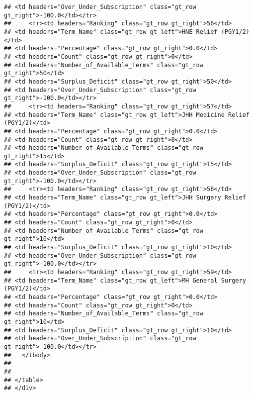 \documentclass[
]{article}
\begin{document}
\begin{verbatim}
## <td headers="Over_Under_Subscription" class="gt_row gt_right">-100.0</td></tr>
##     <tr><td headers="Ranking" class="gt_row gt_right">56</td>
## <td headers="Term_Name" class="gt_row gt_left">HNE Relief (PGY1/2)</td>
## <td headers="Percentage" class="gt_row gt_right">0.0</td>
## <td headers="Count" class="gt_row gt_right">0</td>
## <td headers="Number_of_Available_Terms" class="gt_row gt_right">50</td>
## <td headers="Surplus_Deficit" class="gt_row gt_right">50</td>
## <td headers="Over_Under_Subscription" class="gt_row gt_right">-100.0</td></tr>
##     <tr><td headers="Ranking" class="gt_row gt_right">57</td>
## <td headers="Term_Name" class="gt_row gt_left">JHH Medicine Relief (PGY1/2)</td>
## <td headers="Percentage" class="gt_row gt_right">0.0</td>
## <td headers="Count" class="gt_row gt_right">0</td>
## <td headers="Number_of_Available_Terms" class="gt_row gt_right">15</td>
## <td headers="Surplus_Deficit" class="gt_row gt_right">15</td>
## <td headers="Over_Under_Subscription" class="gt_row gt_right">-100.0</td></tr>
##     <tr><td headers="Ranking" class="gt_row gt_right">58</td>
## <td headers="Term_Name" class="gt_row gt_left">JHH Surgery Relief (PGY1/2)</td>
## <td headers="Percentage" class="gt_row gt_right">0.0</td>
## <td headers="Count" class="gt_row gt_right">0</td>
## <td headers="Number_of_Available_Terms" class="gt_row gt_right">10</td>
## <td headers="Surplus_Deficit" class="gt_row gt_right">10</td>
## <td headers="Over_Under_Subscription" class="gt_row gt_right">-100.0</td></tr>
##     <tr><td headers="Ranking" class="gt_row gt_right">59</td>
## <td headers="Term_Name" class="gt_row gt_left">MH General Surgery (PGY1/2)</td>
## <td headers="Percentage" class="gt_row gt_right">0.0</td>
## <td headers="Count" class="gt_row gt_right">0</td>
## <td headers="Number_of_Available_Terms" class="gt_row gt_right">10</td>
## <td headers="Surplus_Deficit" class="gt_row gt_right">10</td>
## <td headers="Over_Under_Subscription" class="gt_row gt_right">-100.0</td></tr>
##   </tbody>
##   
##   
## </table>
## </div>
\end{verbatim}
\end{document}
